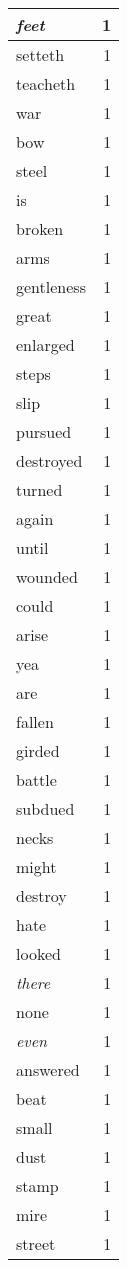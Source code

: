 \begin{center}
\begin{longtable}{l|r}
\emph{feet} & 1 \\ \hline
setteth & 1 \\ \hline
teacheth & 1 \\ \hline
war & 1 \\ \hline
bow & 1 \\ \hline
steel & 1 \\ \hline
is & 1 \\ \hline
broken & 1 \\ \hline
arms & 1 \\ \hline
gentleness & 1 \\ \hline
great & 1 \\ \hline
enlarged & 1 \\ \hline
steps & 1 \\ \hline
slip & 1 \\ \hline
pursued & 1 \\ \hline
destroyed & 1 \\ \hline
turned & 1 \\ \hline
again & 1 \\ \hline
until & 1 \\ \hline
wounded & 1 \\ \hline
could & 1 \\ \hline
arise & 1 \\ \hline
yea & 1 \\ \hline
are & 1 \\ \hline
fallen & 1 \\ \hline
girded & 1 \\ \hline
battle & 1 \\ \hline
subdued & 1 \\ \hline
necks & 1 \\ \hline
might & 1 \\ \hline
destroy & 1 \\ \hline
hate & 1 \\ \hline
looked & 1 \\ \hline
\emph{there} & 1 \\ \hline
none & 1 \\ \hline
\emph{even} & 1 \\ \hline
answered & 1 \\ \hline
beat & 1 \\ \hline
small & 1 \\ \hline
dust & 1 \\ \hline
stamp & 1 \\ \hline
mire & 1 \\ \hline
street & 1 \\ \hline

\end{longtable}
\end{center}

